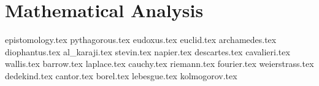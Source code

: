 \part{Mathematical Analysis}

{epistomology.tex}
{pythagorous.tex}
{eudoxus.tex}
{euclid.tex}
{archamedes.tex}
{diophantus.tex}
{al_karaji.tex}
{stevin.tex}
{napier.tex}
{descartes.tex}
{cavalieri.tex}
{wallis.tex}
{barrow.tex}
{laplace.tex}
{cauchy.tex}
{riemann.tex}
{fourier.tex}
{weierstrass.tex}
{dedekind.tex}
{cantor.tex}
{borel.tex}
{lebesgue.tex}
{kolmogorov.tex}